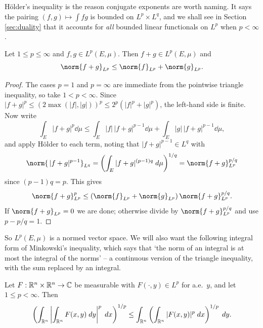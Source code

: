 \documentclass[a4paper]{scrartcl}
\begin{document}
H\"older's inequality is the reason conjugate exponents are worth naming. It says the pairing $(f,g) \mapsto \int fg$ is bounded on $L^p \times L^q$, and we shall see in Section \ref{sec:duality} that it accounts for \emph{all} bounded linear functionals on $L^p$ when $p < \infty$.

\begin{theorem}\label{aof-thm:minkowski}
	Let $1 \le p \le \infty$ and $f, g \in L^p(E,\mu)$. Then $f + g \in L^p(E,\mu)$ and
	$$\norm{f+g}_{L^p} \le \norm{f}_{L^p} + \norm{g}_{L^p}.$$
\end{theorem}

\begin{proof}
	The cases $p = 1$ and $p = \infty$ are immediate from the pointwise triangle inequality, so take $1 < p < \infty$. Since $|f+g|^p \le (2\max(|f|,|g|))^p \le 2^p(|f|^p + |g|^p)$, the left-hand side is finite. Now write
	$$\int_E |f+g|^p \dd\mu \le \int_E |f| \, |f+g|^{p-1} \dd \mu + \int_E |g|\, |f+g|^{p-1}\dd\mu,$$
	and apply H\"older to each term, noting that $|f+g|^{p-1} \in L^q$ with
	$$\norm{ \, |f+g|^{p-1}}_{L^q} = \left( \int_E |f+g|^{(p-1)q} \dd \mu\right)^{1/q} = \norm{f+g}_{L^p}^{p/q}$$
	since $(p-1)q = p$. This gives
	$$\norm{f+g}_{L^p}^p \le \left( \norm{f}_{L^p} + \norm{g}_{L^p}\right) \norm{f+g}_{L^p}^{p/q}.$$
	If $\norm{f+g}_{L^p} = 0$ we are done; otherwise divide by $\norm{f+g}_{L^p}^{p/q}$ and use $p - p/q = 1$.
\end{proof}

So $L^p(E,\mu)$ is a normed vector space. We will also want the following integral form of Minkowski's inequality, which says that `the norm of an integral is at most the integral of the norms' -- a continuous version of the triangle inequality, with the sum replaced by an integral.

\begin{lemma}\label{lem:minkint}
	Let $F : \mathbb{R}^n \times \mathbb{R}^n \to \mathbb{C}$ be measurable with $F(\cdot, y) \in L^p$ for a.e.\ $y$, and let $1 \le p < \infty$. Then
	$$\left( \int_{\mathbb{R}^n} \left| \int_{\mathbb{R}^n} F(x,y) \; d y \right|^p \; d x \right)^{1/p} \le \int_{\mathbb{R}^n} \left( \int_{\mathbb{R}^n} |F(x,y)|^p \; d x \right)^{1/p} \; d y.$$
\end{lemma}
\end{document}

